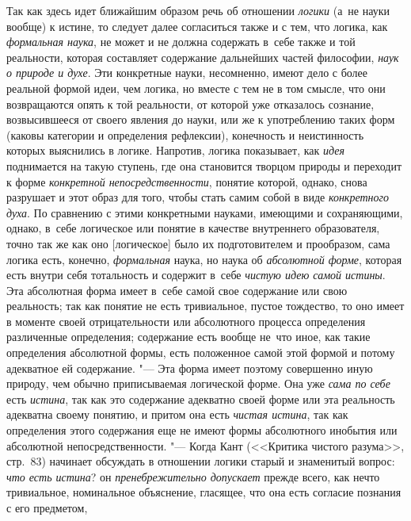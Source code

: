 Так как здесь идет ближайшим образом речь об отношении
{\em логики} (а~не науки
вообще) к истине, то следует далее согласиться также и с тем, что логика,
как {\em формальная наука},
не может и не должна содержать в~себе также и той реальности,
которая составляет содержание дальнейших частей философии,
{\em наук о природе и духе}.
Эти конкретные науки, несомненно, имеют дело с более реальной
формой идеи, чем логика, но вместе с тем не в том смысле, что они
возвращаются опять к той реальности, от которой уже отказалось сознание,
возвысившееся от своего явления до науки, или же к употреблению таких форм
(каковы категории и определения рефлексии), конечность и неистинность
которых выяснились в логике. Напротив, логика показывает, как
{\em идея} поднимается на
такую ступень, где она становится творцом природы и переходит к форме
{\em конкретной непосредственности},
понятие которой, однако, снова разрушает и этот образ для
того, чтобы стать самим собой в виде
{\em конкретного духа}.
По сравнению с этими конкретными науками, имеющими и
сохраняющими, однако, в~себе логическое или понятие в качестве внутреннего
образователя, точно так же как оно [логическое] было их подготовителем и
прообразом, сама логика есть, конечно,
{\em формальная} наука,
но наука об {\em абсолютной форме},
которая есть внутри себя тотальность и содержит в~себе
{\em чистую идею самой истины}.
Эта абсолютная форма имеет в~себе самой свое содержание или
свою реальность; так как понятие не есть тривиальное, пустое тождество, то
оно имеет в моменте своей отрицательности или абсолютного процесса
определения различенные определения; содержание есть вообще не~что иное,
как такие определения абсолютной формы, есть положенное самой этой формой и
потому адекватное ей содержание. "--- Эта форма имеет поэтому
совершенно иную природу, чем обычно приписываемая логической
форме. Она уже {\em сама по себе}
есть {\em истина},
так как это содержание адекватно своей форме или эта
реальность адекватна своему понятию, и притом она есть
{\em чистая истина}, так
как определения этого содержания еще не имеют формы абсолютного инобытия
или абсолютной непосредственности. "--- Когда Кант (<<Критика
чистого разума>>, стр.~83) начинает обсуждать в отношении логики старый и
знаменитый вопрос: {\em что есть
истина}? он
{\em пренебрежительно допускает}
прежде всего, как нечто тривиальное, номинальное
объяснение, гласящее, что она есть согласие познания с его
предметом,
